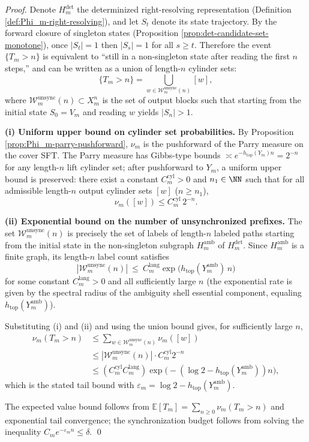 \begin{proof}
Denote \(H_m^{\mathrm{det}}\) the determinized right-resolving representation (Definition \ref{def:Phi_m-right-resolving}), and let \(S_t\) denote its state trajectory.
By the forward closure of singleton states (Proposition \ref{prop:det-candidate-set-monotone}), once \(|S_t|=1\) then \(|S_s|=1\) for all \(s\ge t\). Therefore the event \(\{T_m>n\}\) is equivalent to ``still in a non-singleton state after reading the first \(n\) steps,'' and can be written as a union of length-\(n\) cylinder sets:
\[
\{T_m>n\}=\bigcup_{w\in\mathcal{W}_{m}^{\mathrm{unsync}}(n)}[w],
\]
where \(\mathcal{W}_{m}^{\mathrm{unsync}}(n)\subset X_m^n\) is the set of output blocks such that starting from the initial state \(S_0=V_m\) and reading \(w\) yields \(|S_n|>1\).
\par
\textbf{(i) Uniform upper bound on cylinder set probabilities.}
By Proposition \ref{prop:Phi_m-parry-pushforward}, \(\nu_m\) is the pushforward of the Parry measure on the cover SFT. The Parry measure has Gibbs-type bounds \(\asymp e^{-h_{\mathrm{top}}(Y_m)n}=2^{-n}\) for any length-\(n\) lift cylinder set; after pushforward to \(Y_m\), a uniform upper bound is preserved: there exist a constant \(C_m^{\mathrm{cyl}}>0\) and \(n_1\in\NN\) such that for all admissible length-\(n\) output cylinder sets \([w]\) (\(n\ge n_1\)),
\[
\nu_m([w])\le C_m^{\mathrm{cyl}}\,2^{-n}.
\]
\par
\textbf{(ii) Exponential bound on the number of unsynchronized prefixes.}
The set \(\mathcal{W}_{m}^{\mathrm{unsync}}(n)\) is precisely the set of labels of length-\(n\) labeled paths starting from the initial state in the non-singleton subgraph $H_m^{\mathrm{amb}}$ of $H_m^{\mathrm{det}}$.
Since $H_m^{\mathrm{amb}}$ is a finite graph, its length-\(n\) label count satisfies
\[
|\mathcal{W}_{m}^{\mathrm{unsync}}(n)|
\ \le\
C_m^{\mathrm{lang}}\exp\!\bigl(h_{\mathrm{top}}(Y_m^{\mathrm{amb}})\,n\bigr)
\]
for some constant \(C_m^{\mathrm{lang}}>0\) and all sufficiently large \(n\) (the exponential rate is given by the spectral radius of the ambiguity shell essential component, equaling \(h_{\mathrm{top}}(Y_m^{\mathrm{amb}})\)).
\par
Substituting (i) and (ii) and using the union bound gives, for sufficiently large \(n\),
\[
\begin{aligned}
\nu_m(T_m>n)
&\le \sum_{w\in\mathcal{W}_{m}^{\mathrm{unsync}}(n)}\nu_m([w])\\
&\le |\mathcal{W}_{m}^{\mathrm{unsync}}(n)|\cdot C_m^{\mathrm{cyl}}2^{-n}\\
&\le (C_m^{\mathrm{cyl}}C_m^{\mathrm{lang}})\exp\!\bigl(-(\log 2-h_{\mathrm{top}}(Y_m^{\mathrm{amb}}))n\bigr),
\end{aligned}
\]
which is the stated tail bound with \(\varepsilon_m=\log 2-h_{\mathrm{top}}(Y_m^{\mathrm{amb}})\).
\par
The expected value bound follows from
\(
\mathbb{E}[T_m]=\sum_{n\ge 0}\nu_m(T_m>n)
\)
and exponential tail convergence; the synchronization budget follows from solving the inequality \(C_m e^{-\varepsilon_m n}\le\delta\). \qed
\end{proof}

